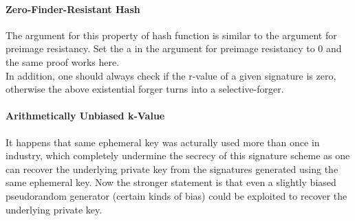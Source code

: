 \documentclass[12]{article}
\begin{document}
\paragraph{Zero-Finder-Resistant Hash} The argument for this property of hash function is similar to the argument for preimage resistancy. Set the a in the argument for preimage resistancy to 0 and the same proof works here.\\

In addition, one should always check if the r-value of a given signature is zero, otherwise the above existential forger turns into a selective-forger.

\paragraph{Arithmetically Unbiased k-Value}
It happens that same ephemeral key was acturally used more than once in industry, which completely undermine the secrecy of this signature scheme as one can recover the underlying private key from the signatures generated using the same ephemeral key.
Now the stronger statement is that even a slightly biased pseudorandom generator (certain kinds of bias) could be exploited to recover the underlying private key.
\end{document}
